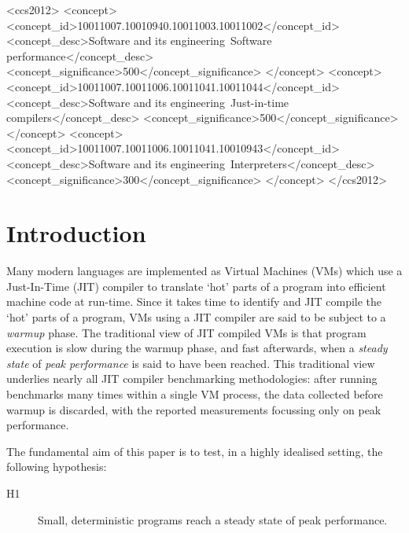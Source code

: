\documentclass[acmsmall]{acmart}\settopmatter{printfolios=true}
\newcommand{\hypone}{H1\xspace}
\begin{document}

\begin{CCSXML}
<ccs2012>
<concept>
<concept_id>10011007.10010940.10011003.10011002</concept_id>
<concept_desc>Software and its engineering~Software performance</concept_desc>
<concept_significance>500</concept_significance>
</concept>
<concept>
<concept_id>10011007.10011006.10011041.10011044</concept_id>
<concept_desc>Software and its engineering~Just-in-time compilers</concept_desc>
<concept_significance>500</concept_significance>
</concept>
<concept>
<concept_id>10011007.10011006.10011041.10010943</concept_id>
<concept_desc>Software and its engineering~Interpreters</concept_desc>
<concept_significance>300</concept_significance>
</concept>
</ccs2012>
\end{CCSXML}

\maketitle

\section{Introduction}
\label{sec:intro}

Many modern languages are implemented as Virtual Machines (VMs) which use a
Just-In-Time (JIT) compiler to translate `hot' parts of a program into efficient
machine code at run-time. Since it takes time to identify and JIT compile
the `hot' parts of a program, VMs using a JIT compiler are
said to be subject to a \emph{warmup} phase. The traditional view of
JIT compiled VMs is that program execution is slow during the warmup phase, and
fast afterwards, when a \emph{steady state} of \emph{peak performance} is said to have been reached.
This traditional view underlies nearly all JIT compiler benchmarking methodologies:
after running benchmarks many times within a single VM process, the
data collected before warmup is discarded, with the reported measurements
focussing only on peak performance.

The fundamental aim of this paper is to test, in a highly idealised setting, the following hypothesis:
\begin{description}
  \item[\hypone] Small, deterministic programs reach a steady state of peak performance.
\end{description}
\end{document}
